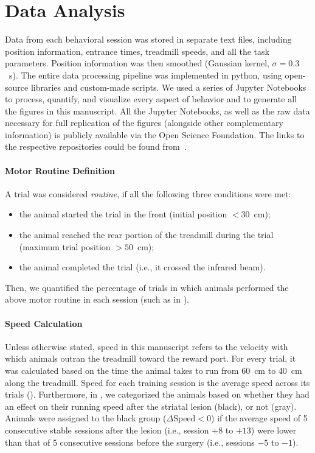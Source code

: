 \section{Data Analysis} 
\label{ch:methods:dataAnalysis}

Data from each behavioral session was stored in separate text files, including position information, entrance times, treadmill speeds, and all the task parameters.
Position information was then smoothed (Gaussian kernel, $\sigma = 0.3$~s).
The entire data processing pipeline was implemented in python, using open-source libraries and custom-made scripts.
We used a series of Jupyter Notebooks to process, quantify, and visualize every aspect of behavior and to generate all the figures in this manuscript.
All the Jupyter Notebooks, as well as the raw data necessary for full replication of the figures (alongside other complementary information) is publicly available via the Open Science Foundation.
The links to the respective repositories could be found from~\cite{Safaie2020PNAS,JuradoParras2020}.

\paragraph{Motor Routine Definition}
A trial was considered \emph{routine}\!{}, if all the following three conditions were met:
\begin{itemize}[noitemsep]
    \item the animal started the trial in the front (initial position $< 30$~cm);
    \item the animal reached the rear portion of the treadmill during the trial (maximum trial position $>50$~cm);
    \item the animal completed the trial (i.e., it crossed the infrared beam).
\end{itemize}
Then, we quantified the percentage of trials in which animals performed the above motor routine in each session (such as in ).

\paragraph{Speed Calculation}
Unless otherwise stated, speed in this manuscript refers to the velocity with which animals outran the treadmill toward the reward port.
For every trial, it was calculated based on the time the animal takes to run from 60~cm to 40~cm along the treadmill.
Speed for each training session is the average speed across its trials ().
Furthermore, in , we categorized the animals based on whether they had an effect on their running speed after the striatal lesion (black), or not (gray).
Animals were assigned to the black group ($\Delta$Speed$<0$) if the average speed of 5 consecutive stable sessions after the lesion (i.e., session $+8$ to $+13$) were lower than that of 5 consecutive sessions before the surgery (i.e., sessions $-5$ to $-1$).


